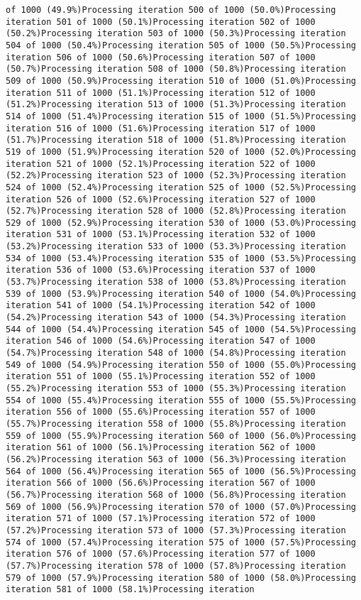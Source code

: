 \documentclass[
]{article}
\begin{document}
\begin{verbatim}
of 1000 (49.9%)Processing iteration 500 of 1000 (50.0%)Processing iteration 501 of 1000 (50.1%)Processing iteration 502 of 1000 (50.2%)Processing iteration 503 of 1000 (50.3%)Processing iteration 504 of 1000 (50.4%)Processing iteration 505 of 1000 (50.5%)Processing iteration 506 of 1000 (50.6%)Processing iteration 507 of 1000 (50.7%)Processing iteration 508 of 1000 (50.8%)Processing iteration 509 of 1000 (50.9%)Processing iteration 510 of 1000 (51.0%)Processing iteration 511 of 1000 (51.1%)Processing iteration 512 of 1000 (51.2%)Processing iteration 513 of 1000 (51.3%)Processing iteration 514 of 1000 (51.4%)Processing iteration 515 of 1000 (51.5%)Processing iteration 516 of 1000 (51.6%)Processing iteration 517 of 1000 (51.7%)Processing iteration 518 of 1000 (51.8%)Processing iteration 519 of 1000 (51.9%)Processing iteration 520 of 1000 (52.0%)Processing iteration 521 of 1000 (52.1%)Processing iteration 522 of 1000 (52.2%)Processing iteration 523 of 1000 (52.3%)Processing iteration 524 of 1000 (52.4%)Processing iteration 525 of 1000 (52.5%)Processing iteration 526 of 1000 (52.6%)Processing iteration 527 of 1000 (52.7%)Processing iteration 528 of 1000 (52.8%)Processing iteration 529 of 1000 (52.9%)Processing iteration 530 of 1000 (53.0%)Processing iteration 531 of 1000 (53.1%)Processing iteration 532 of 1000 (53.2%)Processing iteration 533 of 1000 (53.3%)Processing iteration 534 of 1000 (53.4%)Processing iteration 535 of 1000 (53.5%)Processing iteration 536 of 1000 (53.6%)Processing iteration 537 of 1000 (53.7%)Processing iteration 538 of 1000 (53.8%)Processing iteration 539 of 1000 (53.9%)Processing iteration 540 of 1000 (54.0%)Processing iteration 541 of 1000 (54.1%)Processing iteration 542 of 1000 (54.2%)Processing iteration 543 of 1000 (54.3%)Processing iteration 544 of 1000 (54.4%)Processing iteration 545 of 1000 (54.5%)Processing iteration 546 of 1000 (54.6%)Processing iteration 547 of 1000 (54.7%)Processing iteration 548 of 1000 (54.8%)Processing iteration 549 of 1000 (54.9%)Processing iteration 550 of 1000 (55.0%)Processing iteration 551 of 1000 (55.1%)Processing iteration 552 of 1000 (55.2%)Processing iteration 553 of 1000 (55.3%)Processing iteration 554 of 1000 (55.4%)Processing iteration 555 of 1000 (55.5%)Processing iteration 556 of 1000 (55.6%)Processing iteration 557 of 1000 (55.7%)Processing iteration 558 of 1000 (55.8%)Processing iteration 559 of 1000 (55.9%)Processing iteration 560 of 1000 (56.0%)Processing iteration 561 of 1000 (56.1%)Processing iteration 562 of 1000 (56.2%)Processing iteration 563 of 1000 (56.3%)Processing iteration 564 of 1000 (56.4%)Processing iteration 565 of 1000 (56.5%)Processing iteration 566 of 1000 (56.6%)Processing iteration 567 of 1000 (56.7%)Processing iteration 568 of 1000 (56.8%)Processing iteration 569 of 1000 (56.9%)Processing iteration 570 of 1000 (57.0%)Processing iteration 571 of 1000 (57.1%)Processing iteration 572 of 1000 (57.2%)Processing iteration 573 of 1000 (57.3%)Processing iteration 574 of 1000 (57.4%)Processing iteration 575 of 1000 (57.5%)Processing iteration 576 of 1000 (57.6%)Processing iteration 577 of 1000 (57.7%)Processing iteration 578 of 1000 (57.8%)Processing iteration 579 of 1000 (57.9%)Processing iteration 580 of 1000 (58.0%)Processing iteration 581 of 1000 (58.1%)Processing iteration 
\end{verbatim}
\end{document}
